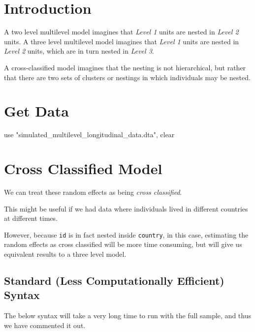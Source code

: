 \documentclass[
  letterpaper,
  DIV=11,
  numbers=noendperiod]{scrreprt}
\newenvironment{Shaded}{\begin{snugshade}}{\end{snugshade}}
\newcommand{\KeywordTok}[1]{\textcolor[rgb]{0.00,0.23,0.31}{#1}}
\newcommand{\NormalTok}[1]{\textcolor[rgb]{0.00,0.23,0.31}{#1}}
\newcommand{\StringTok}[1]{\textcolor[rgb]{0.13,0.47,0.30}{#1}}
\begin{document}
\section{Introduction}\label{introduction-1}

A two level multilevel model imagines that \emph{Level 1} units are
nested in \emph{Level 2} units. A three level multilevel model imagines
that \emph{Level 1} units are nested in \emph{Level 2} units, which are
in turn nested in \emph{Level 3}.

A cross-classified model imagines that the nesting is not hierarchical,
but rather that there are two sets of clusters or nestings in which
individuals may be nested.

\section{Get Data}\label{get-data-2}

\begin{Shaded}
\begin{Highlighting}[]

\KeywordTok{use} \StringTok{"simulated\_multilevel\_longitudinal\_data.dta"}\NormalTok{, }\KeywordTok{clear}
\end{Highlighting}
\end{Shaded}

\section{Cross Classified Model}\label{cross-classified-model}

We can treat these random effects as being \emph{cross classified}.

This might be useful if we had data where individuals lived in different
countries at different times.

However, because \texttt{id} is in fact nested inside \texttt{country},
in this case, estimating the random effects as cross classified will be
more time consuming, but will give us equivalent results to a three
level model.

\subsection{Standard (Less Computationally Efficient)
Syntax}\label{standard-less-computationally-efficient-syntax}

The below syntax will take a very long time to run with the full sample,
and thus we have commented it out.
\end{document}
